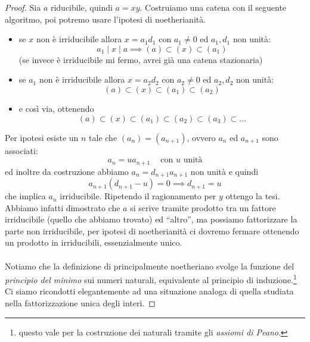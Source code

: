 \begin{proof}
	Sia $a$ riducibile, quindi $a=xy$. Costruiamo una catena con il seguente algoritmo, poi potremo usare l'ipotesi di noetherianità.
	\begin{itemize}
		\item se $x$ non è irriducibile allora $x=a_1d_1$ con $a_1 \neq 0$ ed $a_1,d_1$ non unità:
		\begin{equation*}
		a_1\mid x \mid a \implies (a)\subset(x)\subset(a_1)
		\end{equation*}
		(se invece è irriducibile mi fermo, avrei già una catena stazionaria)
		\item se $a_1$ non è irriducibile allora $x=a_2d_2$ con $a_2 \neq 0$ ed $a_2,d_2$ non unità:
		\begin{equation*}
		(a)\subset(x)\subset(a_1)\subset(a_2)
		\end{equation*}
		\item e così via, ottenendo
		\begin{equation*}
		(a)\subset(x)\subset(a_1)\subset(a_2)\subset(a_3)\subset\dots
		\end{equation*}
	\end{itemize}
	Per ipotesi esiste un $n$ tale che $(a_n)=(a_{n+1})$, ovvero $a_{n}$ ed $a_{n+1}$ sono associati:
	\begin{equation*}
	a_{n}=ua_{n+1} \ \ \ \ \text{ con $u$ unità}
	\end{equation*}
	ed inoltre da costruzione abbiamo $a_{n}=d_{n+1}a_{n+1}$ non unità e quindi
	\begin{equation*}
	a_{n+1}(d_{n+1}-u)=0 \implies d_{n+1}=u
	\end{equation*}
	che implica $a_n$ irriducibile. Ripetendo il ragionamento per $y$ ottengo la tesi. \\ Abbiamo infatti dimostrato che $a$ si scrive tramite prodotto tra un fattore irriducibile (quello che abbiamo trovato) ed \enquote{altro}, ma possiamo fattorizzare la parte non irriducibile, per ipotesi di noetherianità ci dovremo fermare ottenendo un prodotto in irriducibili, essenzialmente unico. \\ \\ Notiamo che la definizione di principalmente noetheriano svolge la funzione del \textit{principio del minimo} sui numeri naturali, equivalente al principio di induzione.\footnote{questo vale per la costruzione dei naturali tramite gli \textit{assiomi di Peano}.} Ci siamo ricondotti elegantemente ad una situazione analoga di quella studiata nella fattorizzazione unica degli interi.
\end{proof}
